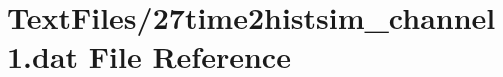 \hypertarget{27time2histsim__channel1_8dat}{}\section{Text\+Files/27time2histsim\+\_\+channel1.dat File Reference}
\label{27time2histsim__channel1_8dat}
